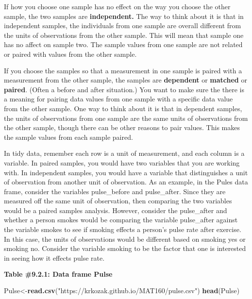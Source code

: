\documentclass[]{book}
\newenvironment{Shaded}{\begin{snugshade}}{\end{snugshade}}
\newcommand{\KeywordTok}[1]{\textcolor[rgb]{0.13,0.29,0.53}{\textbf{#1}}}
\newcommand{\NormalTok}[1]{#1}
\newcommand{\StringTok}[1]{\textcolor[rgb]{0.31,0.60,0.02}{#1}}
\begin{document}
If how you choose one sample has no effect on the way you choose the other sample, the two samples are \textbf{independent.} The way to think about it is that in independent samples, the individuals from one sample are overall different from the units of observations from the other sample. This will mean that sample one has no affect on sample two. The sample values from one sample are not related or paired with values from the other sample.

If you choose the samples so that a measurement in one sample is paired with a measurement from the other sample, the samples are \textbf{dependent} or \textbf{matched} or \textbf{paired}. (Often a before and after situation.) You want to make sure the there is a meaning for pairing data values from one sample with a specific data value from the other sample. One way to think about it is that in dependent samples, the units of observations from one sample are the same units of observations from the other sample, though there can be other reasons to pair values. This makes the sample values from each sample paired.

In tidy data, remember each row is a unit of measurement, and each column is a variable. In paired samples, you would have two variables that you are working with. In independent samples, you would have a variable that distinguishes a unit of observation from another unit of observation. As an example, in the Pules data frame, consider the variables pulse\_before and pulse\_after. Since they are measured off the same unit of observation, then comparing the two variables would be a paired samples analysis. However, consider the pulse\_after and whether a person smokes would be comparing the variable pulse\_after against the variable smokes to see if smoking effects a person's pulse rate after exercise. In this case, the units of observations would be different based on smoking yes or smoking no. Consider the variable smoking to be the factor that one is interested in seeing how it effects pulse rate.

\textbf{Table \#9.2.1: Data frame Pulse}

\begin{Shaded}
\begin{Highlighting}[]
\NormalTok{Pulse<-}\KeywordTok{read.csv}\NormalTok{(}\StringTok{"https://krkozak.github.io/MAT160/pulse.csv"}\NormalTok{)}
\KeywordTok{head}\NormalTok{(Pulse)}
\end{Highlighting}
\end{Shaded}
\end{document}

